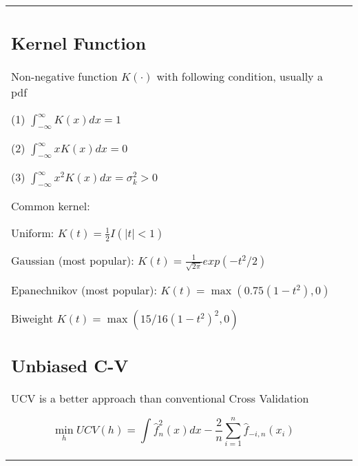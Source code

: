 \begin{tabulary}{\textwidth}{l L}
\subsection{Kernel Function}

Non-negative function $K(\cdot)$ with following condition, usually a pdf

(1) $\int_{-\infty}^\infty K(x) dx = 1$

(2) $\int_{-\infty}^\infty x K(x) dx = 0$

(3) $\int_{-\infty}^\infty x^2 K(x) dx = \sigma_k^2 > 0$

Common kernel:

Uniform:
$K(t) = \frac{1}{2} I(|t| < 1)$

Gaussian (most popular):
$K(t) = \frac{1}{\sqrt{2\pi}}exp(-t^2/2)$

Epanechnikov (most popular):
$K(t) = \max(0.75 (1-t^2) , 0)$

Biweight
$K(t) = \max(15/16 (1-t^2)^2, 0)$

\subsection{Unbiased C-V}

UCV is a better approach than conventional Cross Validation

$$
\min_h UCV(h) = \int \hat{f}_n^2(x) dx - \frac{2}{n} \sum_{i=1}^n \hat{f}_{-i, n} (x_i)
$$

\end{tabulary}